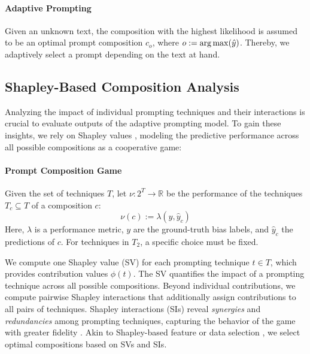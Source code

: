 \paragraph{Adaptive Prompting}
Given an unknown text, the composition with the highest likelihood is assumed to be an optimal prompt composition $c_o$, where $o := \operatorname*{arg\,max}(\hat{y})$. Thereby, we adaptively select a prompt depending on the text at hand.

\subsection{Shapley-Based Composition Analysis}

Analyzing the impact of individual prompting techniques and their interactions is crucial to evaluate outputs of the adaptive prompting model. To gain these insights, we rely on Shapley values  \cite{shapley1953}, modeling the predictive performance across all possible compositions as a cooperative game:

\paragraph{Prompt Composition Game}
Given the set of techniques $T$, let $\nu: 2^T \to \mathbb{R}$ be the performance of the techniques $T_c \subseteq T$ of a composition $c$:
\begin{equation}\label{def-prompt-composition}
    \nu(c) := \lambda(y,\hat y_c)
\end{equation}
Here, $\lambda$ is a performance metric, $y$ are the ground-truth bias labels, and $\hat y_c$ the predictions of $c$.
For techniques in $T_2$, a specific choice must be fixed.

We compute one Shapley value (SV) for each prompting technique $t \in T$, which provides contribution values $\phi(t)$. The SV quantifies the impact of a prompting technique across all possible compositions.
Beyond individual contributions, we compute pairwise Shapley interactions
\cite{Lundberg.2020} that additionally assign contributions to all pairs of techniques. Shapley interactions (SIs) reveal \emph{synergies} and \emph{redundancies} among prompting techniques, capturing the behavior of the game with greater fidelity \cite{Tsai.2022,fumagalli2024kernelshapiq}. Akin to Shapley-based feature or data selection \cite{Rozemberczki2022}, we select optimal compositions based on SVs and SIs.
